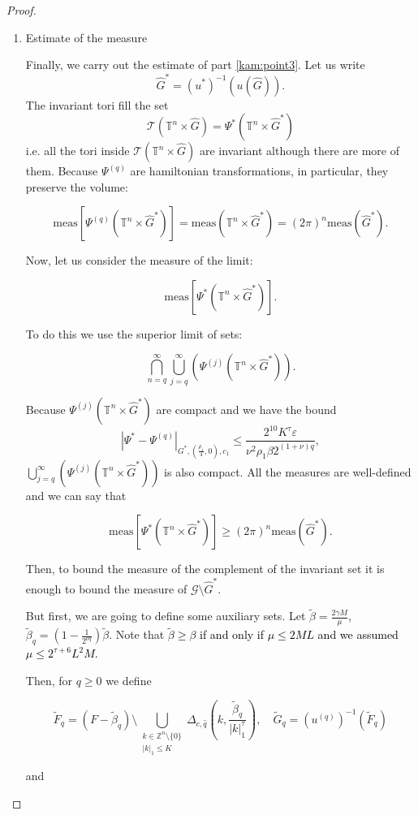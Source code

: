 \begin{proof}
\begin{enumerate}
\item Estimate of the measure

Finally, we carry out the estimate of part \ref{kam:point3}. Let us write $$\hat G^* = (u^*)^{-1}(u(\hat G)).$$
The invariant tori fill the set 
$$\mathcal{T}(\mathbb{T}^n\times \hat G) = \Psi^* (\mathbb{T}^n\times \hat G^*)$$
 i.e. all the tori inside $\mathcal{T}(\mathbb{T}^n\times \hat G)$ are invariant although there are more of them.
Because $\Psi^{(q)}$ are hamiltonian transformations, in particular, they preserve the volume:

$$\text{meas}[\Psi^{(q)}(\mathbb{T}^n\times \hat G^* )] = \text{meas}(\mathbb{T}^n\times \hat G^*) = (2\pi)^{n}\text{meas}(\hat G^*).$$

Now, let us consider the measure of the limit:

$$\text{meas}[\Psi^*(\mathbb{T}^n\times \hat G^*)].$$

To do this we use the superior limit of sets:

$$\bigcap_{n=q}^{\infty} \bigcup_{j=q}^{\infty} (\Psi^{(j)}(\mathbb{T}^n \times \hat G^*)).$$

Because $\Psi^{(j)}(\mathbb{T}^n\times \hat G^*)$ are compact and we have the bound 
$$|\Psi^* - \Psi^{(q)}|_{G^* , (\frac{\rho_1}{4},0), c_1} \leq \frac{2^{10} K^\tau \varepsilon}{\nu^2 \rho_1 \beta 2^{(1+\nu)q}},$$
 $\bigcup_{j=q}^\infty(\Psi^{(j)}(\mathbb{T}^n\times \hat G^*))$ is also compact. All the measures are well-defined and we can say that

$$\text{meas}[\Psi^*(\mathbb{T}^n\times \hat G^* )] \geq (2\pi)^n\text{meas}(\hat G^*).$$

Then, to bound the measure of the complement of the invariant set it is enough to bound the measure of $\mathcal{G}\setminus \hat G^*$.

But first, we are going to define some auxiliary sets. Let $\tilde \beta = \frac{2 \gamma M}{\mu}$, $\tilde\beta_q = (1-\frac{1}{2^{\nu q}})\tilde \beta$. Note that \textcolor{black}{$\tilde \beta \geq \beta$ if and only if $\mu \leq 2ML$ and we assumed $\mu \leq 2^{\tau+6}L^2 M$.}

Then, for $q \geq 0$ we define

$$\tilde F_q = (F - \tilde\beta_q) \setminus \bigcup_{\substack{k\in\mathbb{Z}^n\setminus\{0\} \\ |k|_1 \leq K}} \Delta_{c,\hat q}(k,\frac{\tilde \beta_q}{|k|_1^\tau}), \quad \tilde G_q = (u^{(q)})^{-1}(\tilde F_q)$$

and



\end{enumerate}
\end{proof}
